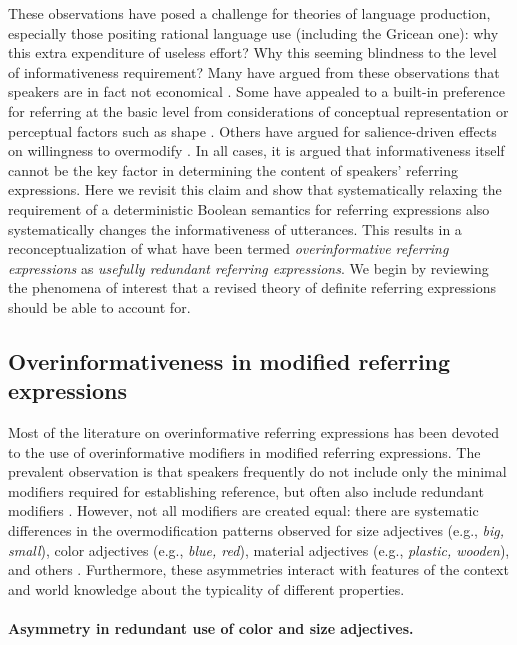 \documentclass[11pt]{article}
\begin{document}
These observations have posed a challenge for theories of language production, especially those positing rational language use (including the Gricean one): why this extra expenditure of useless effort? Why this seeming blindness to the level of informativeness requirement? Many have argued from these observations that speakers are in fact not economical \cite{Engelhardt2006, Pechmann1989}. Some have appealed to a built-in preference for referring at the basic level from considerations of conceptual representation or perceptual factors such as shape \cite{Rosch1976, Rosch1973, murphy1982basic}. Others have argued for salience-driven effects on willingness to overmodify \cite{Gatt2014, Westerbeek2015}. In all cases, it is argued that informativeness itself cannot be the key factor in determining the content of speakers' referring expressions. Here we revisit this claim and show that systematically relaxing the requirement of a deterministic Boolean semantics for referring expressions also systematically changes the informativeness of utterances. This results in a reconceptualization of what have been termed \emph{overinformative referring expressions} as \emph{usefully redundant referring expressions}. We begin by reviewing the phenomena of interest that a revised theory of definite referring expressions should be able to account for. 

\subsection{Overinformativeness in modified referring expressions}
\label{sec:modified}

Most of the literature on overinformative referring expressions has been devoted to the use of overinformative modifiers in modified referring expressions. The prevalent observation is that speakers frequently do not include only the minimal modifiers required for establishing reference, but often also include redundant modifiers \cite{Pechmann1989, nadig2002, Maes2004, Engelhardt2006, Arts2011, Koolen2011}. However, not all modifiers are created equal: there are systematic differences in the overmodification patterns observed for size adjectives (e.g., \emph{big, small}), color adjectives (e.g., \emph{blue, red}), material adjectives (e.g., \emph{plastic, wooden}), and others \cite{sedivy2003a}. Furthermore, these asymmetries interact with features of the context and world knowledge about the typicality of different properties.   

\paragraph{Asymmetry in redundant use of color and size adjectives.}
\label{sec:asymmetry}
\end{document}
